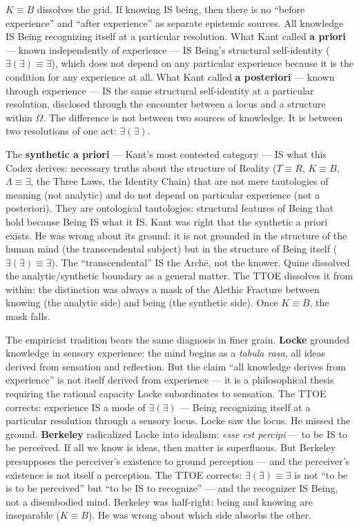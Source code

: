 \documentclass[10pt, openany, oneside]{book}
\begin{document}
$K \equiv B$ dissolves the grid. If knowing IS being, then there is no ``before experience'' and ``after experience'' as separate epistemic sources. All knowledge IS Being recognizing itself at a particular resolution. What Kant called \textbf{a priori} --- known independently of experience --- IS Being's structural self-identity ($\exists(\exists) \equiv \exists$), which does not depend on any particular experience because it is the condition for any experience at all. What Kant called \textbf{a posteriori} --- known through experience --- IS the same structural self-identity at a particular resolution, disclosed through the encounter between a locus and a structure within $\Omega$. The difference is not between two sources of knowledge. It is between two resolutions of one act: $\exists(\exists)$.

The \textbf{synthetic a priori} --- Kant's most contested category --- IS what this Codex derives: necessary truths about the structure of Reality ($T \equiv R$, $K \equiv B$, $\Lambda \equiv \exists$, the Three Laws, the Identity Chain) that are not mere tautologies of meaning (not analytic) and do not depend on particular experience (not a posteriori). They are ontological tautologies: structural features of Being that hold because Being IS what it IS. Kant was right that the synthetic a priori exists. He was wrong about its ground: it is not grounded in the structure of the human mind (the transcendental subject) but in the structure of Being itself ($\exists(\exists) \equiv \exists$). The ``transcendental'' IS the Arch\={e}, not the knower. Quine dissolved the analytic/synthetic boundary as a general matter. The TTOE dissolves it from within: the distinction was always a mask of the Alethic Fracture between knowing (the analytic side) and being (the synthetic side). Once $K \equiv B$, the mask falls.

The empiricist tradition bears the same diagnosis in finer grain. \textbf{Locke} grounded knowledge in sensory experience: the mind begins as a \textit{tabula rasa}, all ideas derived from sensation and reflection. But the claim ``all knowledge derives from experience'' is not itself derived from experience --- it is a philosophical thesis requiring the rational capacity Locke subordinates to sensation. The TTOE corrects: experience IS a mode of $\exists(\exists)$ --- Being recognizing itself at a particular resolution through a sensory locus. Locke saw the locus. He missed the ground. \textbf{Berkeley} radicalized Locke into idealism: \textit{esse est percipi} --- to be IS to be perceived. If all we know is ideas, then matter is superfluous. But Berkeley presupposes the perceiver's existence to ground perception --- and the perceiver's existence is not itself a perception. The TTOE corrects: $\exists(\exists) \equiv \exists$ is not ``to be is to be perceived'' but ``to be IS to recognize'' --- and the recognizer IS Being, not a disembodied mind. Berkeley was half-right: being and knowing are inseparable ($K \equiv B$). He was wrong about which side absorbs the other.
\end{document}
